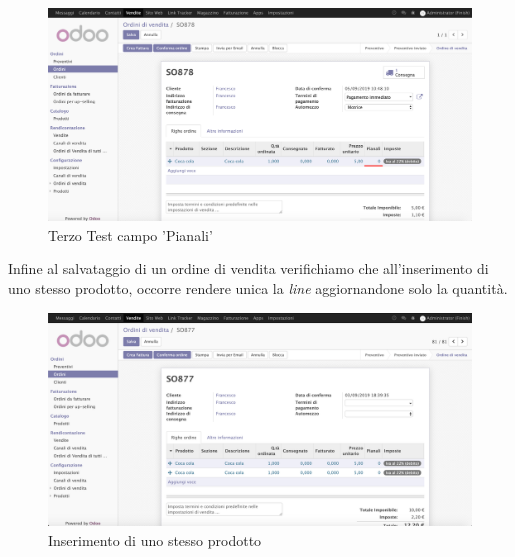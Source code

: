 \begin{figure}[H]
	\begin{center} \includegraphics[scale=0.3]{figures/seventh_test}
		\caption[Terzo Test campo 'Pianali']{Terzo Test campo 'Pianali'}
		\label{fig:seventh_test}
	\end{center}
\end{figure}

\newpage
Infine al salvataggio di un ordine di vendita verifichiamo che all'inserimento di uno stesso prodotto, occorre rendere unica la \textit{line} aggiornandone solo la quantità.

\begin{figure}[H]
	\begin{center} \includegraphics[scale=0.3]{figures/ctrl_1}
		\caption[Inserimento di uno stesso prodotto]{Inserimento di uno stesso prodotto}
		\label{fig:ctrl_1}
	\end{center}
\end{figure}

